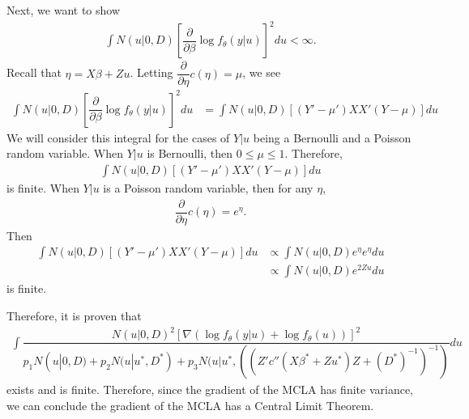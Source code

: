 \documentclass{article}
\begin{document}
Next, we want to show 
\begin{align}
\int N(u|0,D) \left[\dfrac{\partial}{\partial \beta} \log f_\theta(y|u)   \right]^2 du < \infty.
\end{align}
 Recall that $\eta=X \beta +Z u$. Letting $\dfrac{\partial}{\partial \eta} c(\eta)=\mu$, we see 
\begin{align}
\int N(u|0,D) \left[\dfrac{\partial}{\partial \beta} \log f_\theta(y|u)   \right]^2 du &= \int N(u|0,D) \left[ (Y'- \mu') X X'(Y- \mu)   \right] du
\end{align}
We will consider this integral for the cases of $Y|u$ being a Bernoulli and a Poisson random variable. When $Y|u$ is Bernoulli, then $0 \leq \mu \leq 1.$ Therefore,
\begin{align}
\int N(u|0,D) \left[ (Y'- \mu') X X'(Y- \mu)   \right] du
\end{align}
is finite.
When $Y|u$ is a Poisson random variable, then for any  $\eta$, 
\begin{align}
\dfrac{\partial}{\partial \eta} c(\eta) = e^\eta.
\end{align}
Then
\begin{align}
\int N(u|0,D) \left[ (Y'- \mu') X X'(Y- \mu)   \right] du &\propto \int N(u|0,D)  e^{\eta} e^{\eta}    du \\
&\propto \int N(u|0,D) e^{2Zu} du 
\end{align}
is finite.

Therefore, it is proven that 
\begin{align}
\int \dfrac{N(u|0,D)^2 \left[\nabla \left(\log f_\theta(y|u)+\log f_\theta (u) \right) \right]^2}{p_1 N(u|0,D)+p_2 N(u|u^*, D^*) + p_3 N(u|u^*, ((Z'  c''(X \beta^*+Zu^*) Z +(D^*)^{-1}   )^{-1})} du 
\end{align}
exists and is finite. Therefore, since  the gradient of the MCLA has finite variance, we can conclude the gradient of the MCLA has a Central Limit Theorem.

%
\end{document}
